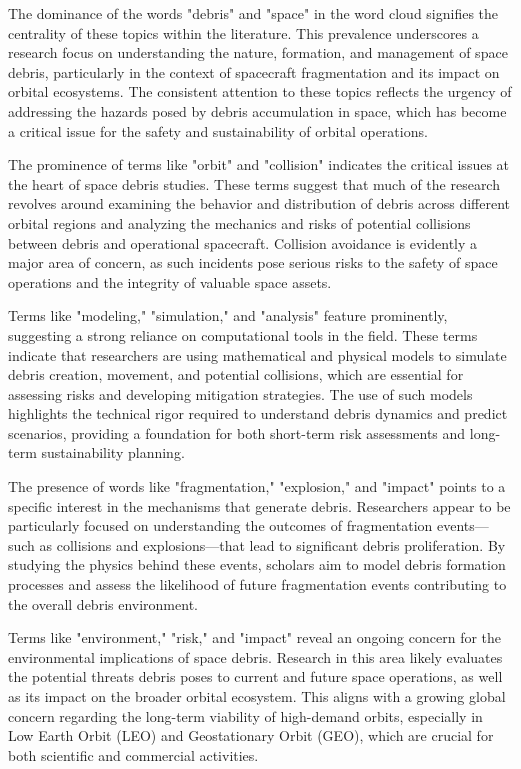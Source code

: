 \documentclass[journal ]{new-aiaa}
\begin{document}
The dominance of the words "debris" and "space" in the word cloud signifies the centrality of these topics within the literature. This prevalence underscores a research focus on understanding the nature, formation, and management of space debris, particularly in the context of spacecraft fragmentation and its impact on orbital ecosystems. The consistent attention to these topics reflects the urgency of addressing the hazards posed by debris accumulation in space, which has become a critical issue for the safety and sustainability of orbital operations.

The prominence of terms like "orbit" and "collision" indicates the critical issues at the heart of space debris studies. These terms suggest that much of the research revolves around examining the behavior and distribution of debris across different orbital regions and analyzing the mechanics and risks of potential collisions between debris and operational spacecraft. Collision avoidance is evidently a major area of concern, as such incidents pose serious risks to the safety of space operations and the integrity of valuable space assets.

Terms like "modeling," "simulation," and "analysis" feature prominently, suggesting a strong reliance on computational tools in the field. These terms indicate that researchers are using mathematical and physical models to simulate debris creation, movement, and potential collisions, which are essential for assessing risks and developing mitigation strategies. The use of such models highlights the technical rigor required to understand debris dynamics and predict scenarios, providing a foundation for both short-term risk assessments and long-term sustainability planning.

The presence of words like "fragmentation," "explosion," and "impact" points to a specific interest in the mechanisms that generate debris. Researchers appear to be particularly focused on understanding the outcomes of fragmentation events—such as collisions and explosions—that lead to significant debris proliferation. By studying the physics behind these events, scholars aim to model debris formation processes and assess the likelihood of future fragmentation events contributing to the overall debris environment.

Terms like "environment," "risk," and "impact" reveal an ongoing concern for the environmental implications of space debris. Research in this area likely evaluates the potential threats debris poses to current and future space operations, as well as its impact on the broader orbital ecosystem. This aligns with a growing global concern regarding the long-term viability of high-demand orbits, especially in Low Earth Orbit (LEO) and Geostationary Orbit (GEO), which are crucial for both scientific and commercial activities.
\end{document}
